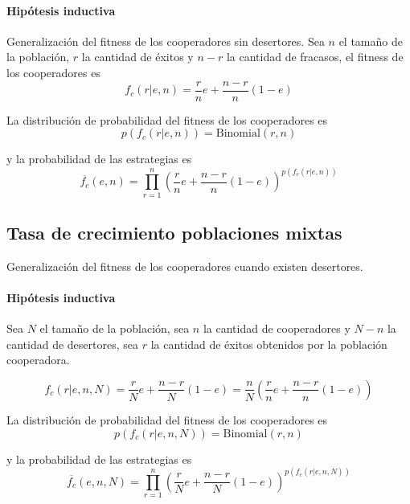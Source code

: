 \documentclass[a4paper,10pt]{article}
\begin{document}
\paragraph{Hipótesis inductiva} Generalización del fitness de los cooperadores sin desertores.
Sea $n$ el tamaño de la población, $r$ la cantidad de éxitos y $n-r$ la cantidad de fracasos, el fitness de los cooperadores es
\begin{equation}
f_c(r|e,n) = \frac{r}{n} e + \frac{n-r}{n}(1-e)
\end{equation}

La distribución de probabilidad del fitness de los cooperadores es
\begin{equation}
p(f_c(r|e,n)) = \text{Binomial}(r,n)
\end{equation}

y la probabilidad de las estrategias es
\begin{equation}
\overline{f_c}(e,n) = \prod_{r=1}^n \left( \frac{r}{n} e + \frac{n-r}{n}(1-e) \right)^{p(f_c(r|e,n))}
\end{equation}



\subsection{Tasa de crecimiento poblaciones mixtas}

Generalización del fitness de los cooperadores cuando existen desertores.

\paragraph{Hipótesis inductiva} Sea $N$ el tamaño de la población, sea $n$ la cantidad de cooperadores y $N-n$ la cantidad de desertores, sea  $r$ la cantidad de éxitos obtenidos por la población cooperadora.

\begin{equation}
f_c(r|e,n,N) =  \frac{r}{N} e + \frac{n-r}{N}(1-e) = \frac{n}{N} \left( \frac{r}{n} e + \frac{n-r}{n}(1-e) \right)
\end{equation}

La distribución de probabilidad del fitness de los cooperadores es
\begin{equation}
p(f_c(r|e,n,N)) = \text{Binomial}(r,n)
\end{equation}

y la probabilidad de las estrategias es
\begin{equation}
\overline{f_c}(e,n,N) = \prod_{r=1}^n \left( \frac{r}{N} e + \frac{n-r}{N}(1-e) \right)^{p(f_c(r|e,n,N))}
\end{equation}
\end{document}

